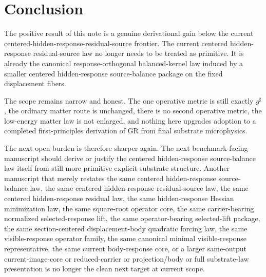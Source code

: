 \documentclass[11pt]{article}
\newcommand{\CompletedMetric}{g^{\sharp}}
\begin{document}
\section{Conclusion}

The positive result of this note is a genuine derivational gain below the current centered-hidden-response-residual-source frontier. The current centered hidden-response residual-source law no longer needs to be treated as primitive. It is already the canonical response-orthogonal balanced-kernel law induced by a smaller centered hidden-response source-balance package on the fixed displacement fibers.

The scope remains narrow and honest. The one operative metric is still exactly \(\CompletedMetric\), the ordinary matter route is unchanged, there is no second operative metric, the low-energy matter law is not enlarged, and nothing here upgrades adoption to a completed first-principles derivation of GR from final substrate microphysics.

The next open burden is therefore sharper again. The next benchmark-facing manuscript should derive or justify the centered hidden-response source-balance law itself from still more primitive explicit substrate structure. Another manuscript that merely restates the same centered hidden-response source-balance law, the same centered hidden-response residual-source law, the same centered hidden-response residual law, the same hidden-response Hessian minimization law, the same square-root operator core, the same carrier-bearing normalized selected-response lift, the same operator-bearing selected-lift package, the same section-centered displacement-body quadratic forcing law, the same visible-response operator family, the same canonical minimal visible-response representative, the same current body-response core, or a larger same-output current-image-core or reduced-carrier or projection/body or full substrate-law presentation is no longer the clean next target at current scope.
\end{document}
